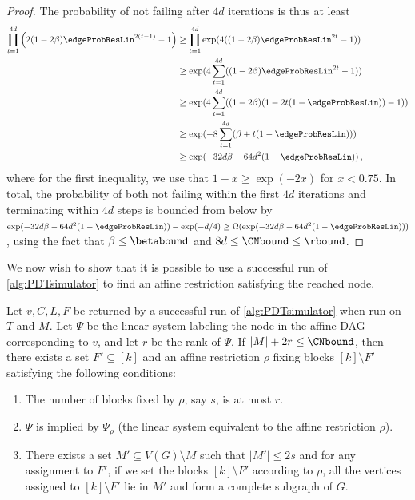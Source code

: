 {\begin{proof}
    The probability of not failing after $4d$ iterations is thus at least
    \begin{align*}
        \prod_{t=1}^{4d}\left(2(1-2\beta)\edgeProbResLin^{2(t-1)}-1\right)
        &\geq \prod_{t=1}^{4d}\exp(4((1-2\beta)\edgeProbResLin^{2t}-1))\\ 
        &\geq\exp(4\sum_{t=1}^{4d}((1-2\beta)\edgeProbResLin^{2t}-1))\\
        &\geq\exp(4\sum_{t=1}^{4d}((1-2\beta)(1-2t(1-\edgeProbResLin))-1))\\ 
        &\geq \exp(-8\sum_{t=1}^{4d}(\beta+t(1-\edgeProbResLin)))\\
        &\geq \exp(-32d\beta-64d^2(1-\edgeProbResLin)) \,,
    \end{align*}
    where for the first inequality, we use that $1-x \geq \exp(-2x)$ for $x<0.75$. In total, the probability of both not failing within the first $4d$ iterations and terminating within $4d$ steps is bounded from below by $\exp(-32d\beta-64d^2(1-\edgeProbResLin))-\exp(-d/4)\geq \Omega(\exp(-32d\beta-64d^2(1-\edgeProbResLin)))$, using the fact that $\beta \leq \betabound$ and $8d\leq\CNbound\leq\rbound$.
    \end{proof}
}



We now wish to show that it is possible to use a successful run of \autoref{alg:PDTsimulator} to find an affine restriction satisfying the reached node. 

\begin{lemma}
    \label{lemma:assignment-extraction}
    Let $v,C,L,F$ be returned by a successful run of \autoref{alg:PDTsimulator} when run on $T$ and $M$. Let $\Psi$ be the linear system labeling the node in the affine-DAG corresponding to $v$, and let $r$ be the rank of $\Psi$. If $|M|+2r\leq \CNbound $, then there exists a set $F'\subseteq [k]$ and an affine restriction $\rho$ fixing blocks $[k]\setminus F'$ satisfying the following conditions:
    \begin{enumerate}
        \item The number of blocks fixed by $\rho$, say $s$, is at most $r$.
        \item $\Psi$ is implied by $\Psi_\rho$ (the linear system equivalent to the affine restriction $\rho$).
        \item There exists a set $M'\subseteq V(G)\setminus M$ such that  $|M'|\leq 2s$ and for any assignment to $F'$, if we set the blocks $[k]\setminus F'$ according to $\rho$, all the vertices assigned to $[k]\setminus F'$ lie in $M'$ and form a complete subgraph of $G$.
    \end{enumerate}
\end{lemma}

